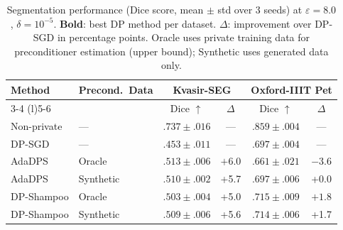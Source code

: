 
\begin{table}[t]
\centering
\caption{Segmentation performance (Dice score, mean $\pm$ std over 3 seeds) at
  $\varepsilon{=}8.0$, $\delta{=}10^{-5}$.
  \textbf{Bold}: best DP method per dataset.
  $\Delta$: improvement over DP-SGD in percentage points.
  Oracle uses private training data for preconditioner estimation (upper bound);
  Synthetic uses generated data only.}
\label{tab:main}
\setlength{\tabcolsep}{3.5pt}
\begin{tabular}{@{}llcccc@{}}
\toprule
\multirow{2}{*}{\textbf{Method}} &
\multirow{2}{*}{\textbf{Precond.\ Data}} &
\multicolumn{2}{c}{\textbf{Kvasir-SEG}} &
\multicolumn{2}{c}{\textbf{Oxford-IIIT Pet}} \\
\cmidrule(lr){3-4} \cmidrule(l){5-6}
& & Dice $\uparrow$ & $\Delta$ & Dice $\uparrow$ & $\Delta$ \\
\midrule
Non-private    & ---       & $.737 \pm .016$  & ---   & $.859 \pm .004$  & --- \\
\midrule
DP-SGD         & ---       & $.453 \pm .011$  & ---   & $.697 \pm .004$  & --- \\
AdaDPS         & Oracle    & $\mathbf{.513 \pm .006}$  & $\mathbf{+6.0}$  & $.661 \pm .021$  & $-$3.6 \\
AdaDPS         & Synthetic & $.510 \pm .002$  & +5.7  & $.697 \pm .006$  & +0.0 \\
DP-Shampoo     & Oracle    & $.503 \pm .004$  & +5.0  & $\mathbf{.715 \pm .009}$ & $\mathbf{+1.8}$ \\
DP-Shampoo     & Synthetic & $.509 \pm .006$  & +5.6  & $.714 \pm .006$ & +1.7 \\
\bottomrule
\end{tabular}
\end{table}


